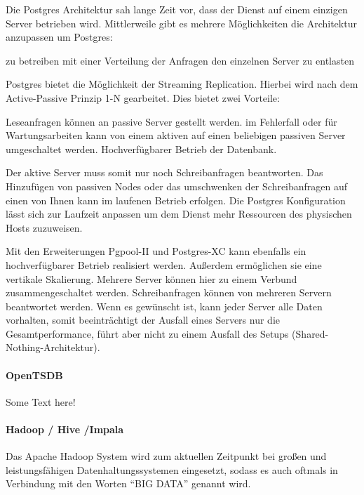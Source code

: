 Die Postgres Architektur sah lange Zeit vor, dass der Dienst auf einem einzigen
Server betrieben wird. Mittlerweile gibt es mehrere Möglichkeiten die
Architektur anzupassen um Postgres:

\begin{outline}
  \1  zu betreiben
  \1 
  \1 mit einer Verteilung der Anfragen den einzelnen Server zu entlasten
\end{outline}

Postgres bietet die Möglichkeit der \gls{Streaming Replication}. Hierbei wird
nach dem \gls{Active-Passive Prinzip} 1-N gearbeitet. Dies bietet zwei
Vorteile:

\begin{outline}
  \1 Leseanfragen können an passive Server gestellt werden.
  \1 im Fehlerfall oder für Wartungsarbeiten kann von einem aktiven auf einen
  beliebigen passiven Server umgeschaltet werden.
  \1 Hochverfügbarer Betrieb der Datenbank.
\end{outline}

Der aktive Server muss somit nur noch Schreibanfragen beantworten. Das
Hinzufügen von passiven Nodes oder das umschwenken der Schreibanfragen auf
einen von Ihnen kann im laufenen Betrieb erfolgen. Die Postgres Konfiguration
lässt sich zur Laufzeit anpassen um dem Dienst mehr Ressourcen des physischen
Hosts zuzuweisen.

Mit den Erweiterungen \gls{Pgpool-II} und \gls{Postgres-XC} kann ebenfalls ein
hochverfügbarer Betrieb realisiert werden. Außerdem ermöglichen sie eine
vertikale \gls{Skalierung}. Mehrere Server können hier zu einem Verbund
zusammengeschaltet werden. Schreibanfragen können von mehreren Servern
beantwortet werden. Wenn es gewünscht ist, kann jeder Server alle Daten
vorhalten, somit beeinträchtigt der Ausfall eines Servers nur die
Gesamtperformance, führt aber nicht zu einem Ausfall des Setups
(Shared-Nothing-Architektur).
\tm%

\paragraph{OpenTSDB}
\label{paragraph:opentsdb}
Some Text here!
\nl%

\paragraph{Hadoop / Hive /Impala}
\label{paragraph:hadoop_hive_impala}
Das Apache Hadoop System wird zum aktuellen Zeitpunkt bei
großen und leistungsfähigen Datenhaltungssystemen eingesetzt, sodass es
auch oftmals in Verbindung mit den Worten ``BIG DATA'' genannt wird.

